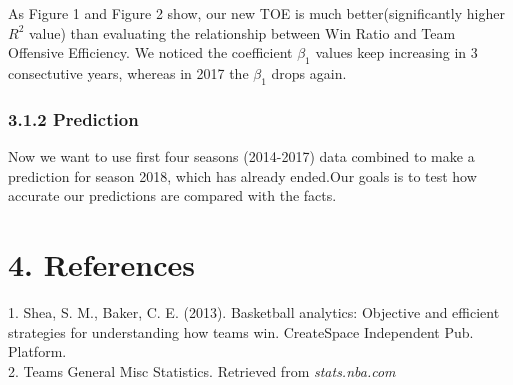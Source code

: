 \documentclass[11pt]{article}
\begin{document}
As Figure 1 and Figure 2 show, our new TOE is much better(significantly higher $R^2$ value) than evaluating the relationship between Win Ratio and Team Offensive Efficiency. We noticed the coefficient $\beta_1$ values keep increasing in 3 consectutive years, whereas in 2017 the $\beta_1$
drops again.

\newpage
\subsubsection*{3.1.2 Prediction}

Now we want to use first four seasons (2014-2017) data combined to make a prediction for season 2018, which has already ended.Our goals is to test how accurate our predictions are compared with the facts.

\newpage
\section*{4. References}
1. Shea, S. M., Baker, C. E. (2013). Basketball analytics: Objective and efficient strategies for understanding how teams win. CreateSpace Independent Pub. Platform.\\
2. Teams General Misc Statistics. Retrieved from \textit{stats.nba.com} 
\end{document}
